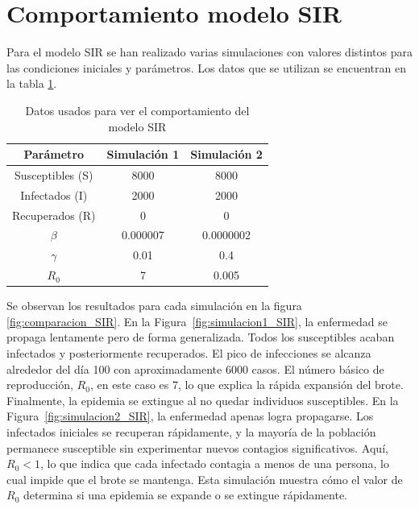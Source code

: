 \section{Comportamiento modelo SIR}
Para el modelo SIR se han realizado varias simulaciones con valores distintos para las condiciones iniciales y parámetros. Los datos que se utilizan se encuentran en la tabla \ref{tab:datos para modelo SIR}.
\begin{table}[H]
\centering
\begin{tabular}{|c|c|c|}
\hline
\textbf{Parámetro} & \textbf{Simulación 1} & \textbf{Simulación 2}  \\
\hline
Susceptibles (S) & 8000 & 8000 \\
\hline
Infectados (I)   & 2000   & 2000   \\
\hline
Recuperados (R)   &  0   & 0   \\
\hline
\(\beta\)        & 0.000007 & 0.0000002  \\
\hline
\(\gamma\)        & 0.01 & 0.4 \\
\hline
$R_0$      &     7   &    0.005       \\
\hline
\end{tabular}
\caption{Datos usados para ver el comportamiento del modelo SIR}
\label{tab:datos para modelo SIR}
\end{table}

Se observan los resultados para cada simulación en la figura \ref{fig:comparacion_SIR}. En la Figura~\ref{fig:simulacion1_SIR}, la enfermedad se propaga lentamente pero de forma generalizada. Todos los susceptibles acaban infectados y posteriormente recuperados. El pico de infecciones se alcanza alrededor del día 100 con aproximadamente 6000 casos. El número básico de reproducción, $R_0$, en este caso es 7, lo que explica la rápida expansión del brote. Finalmente, la epidemia se extingue al no quedar individuos susceptibles.
En la Figura~\ref{fig:simulacion2_SIR}, la enfermedad apenas logra propagarse. Los infectados iniciales se recuperan rápidamente, y la mayoría de la población permanece susceptible sin experimentar nuevos contagios significativos. Aquí, $R_0 < 1$, lo que indica que cada infectado contagia a menos de una persona, lo cual impide que el brote se mantenga. Esta simulación muestra cómo el valor de $R_0$ determina si una epidemia se expande o se extingue rápidamente.

